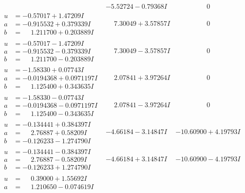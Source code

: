 \documentclass[1p]{elsarticle_modified}
\theoremstyle{definition}
\begin{document}
$$\begin{array}{c|c|c}
 & -5.52724 - 0.79368 I & \phantom{-0.000000 } 0 \\ \hline\begin{aligned}
u &= -0.57017 + 1.47209 I \\
a &= -0.915532 + 0.379339 I \\
b &= \phantom{-}1.211700 + 0.203889 I\end{aligned}
 & \phantom{-}7.30049 + 3.57857 I & \phantom{-0.000000 } 0 \\ \hline\begin{aligned}
u &= -0.57017 - 1.47209 I \\
a &= -0.915532 - 0.379339 I \\
b &= \phantom{-}1.211700 - 0.203889 I\end{aligned}
 & \phantom{-}7.30049 - 3.57857 I & \phantom{-0.000000 } 0 \\ \hline\begin{aligned}
u &= -1.58330 + 0.07743 I \\
a &= -0.0194368 + 0.0971197 I \\
b &= \phantom{-}1.125400 + 0.343635 I\end{aligned}
 & \phantom{-}2.07841 + 3.97264 I & \phantom{-0.000000 } 0 \\ \hline\begin{aligned}
u &= -1.58330 - 0.07743 I \\
a &= -0.0194368 - 0.0971197 I \\
b &= \phantom{-}1.125400 - 0.343635 I\end{aligned}
 & \phantom{-}2.07841 - 3.97264 I & \phantom{-0.000000 } 0 \\ \hline\begin{aligned}
u &= -0.134441 + 0.384397 I \\
a &= \phantom{-}2.76887 + 0.58209 I \\
b &= -0.126233 - 1.274790 I\end{aligned}
 & -4.66184 - 3.14847 I & -10.60900 + 4.19793 I \\ \hline\begin{aligned}
u &= -0.134441 - 0.384397 I \\
a &= \phantom{-}2.76887 - 0.58209 I \\
b &= -0.126233 + 1.274790 I\end{aligned}
 & -4.66184 + 3.14847 I & -10.60900 - 4.19793 I \\ \hline\begin{aligned}
u &= \phantom{-}0.39000 + 1.55692 I \\
a &= \phantom{-}1.210650 - 0.074619 I \\

\end{aligned}
\end{array}$$
\end{document}
